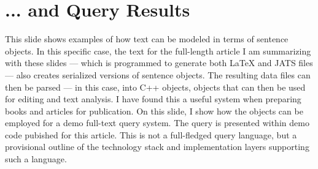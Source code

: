 

\section{... and Query Results}\fbeg{}\begin{frame}{}


\hspace{9pt}\begin{ftxt}[.82\textwidth]

This slide shows examples of how text can be modeled in terms 
of sentence objects.  In this specific case, the text for 
the full-length article I am summarizing with these slides 
--- which is programmed to generate both \LaTeX{} and 
JATS files --- also creates serialized versions 
of sentence objects.  The resulting data files 
can then be parsed --- in this case, into C++ objects, 
objects that can then be used for editing and text 
analysis.  I have found this a useful system when 
preparing books and articles for publication.  
On this slide, I show how the objects can be 
employed for a demo full-text query system.  
The query is presented within demo code 
pubished for this article.  This is not a 
full-fledged query language, but a provisional 
outline of the technology stack and 
implementation layers supporting such a language.

\end{ftxt}


\end{frame}


